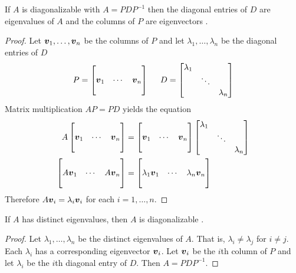 \begin{proposition}
If $A$ is diagonalizable with $A = PDP^{-1}$ then the diagonal entries of $D$ are eigenvalues of $A$ and the columns of $P$ are eigenvectors \cite[p.179]{KN}.

\begin{proof}
Let $\boldsymbol{v}_1,\dots, \boldsymbol{v}_n$ be the columns of $P$ and let $\lambda_1,\dots,\lambda_n$ be the diagonal entries of $D$
$$
P = \begin{bmatrix} & & \\ \boldsymbol{v}_1 & \cdots & \boldsymbol{v}_n \\ & & \end{bmatrix}
\hspace{5mm}
D = \begin{bmatrix} \lambda_1 & & \\ & \ddots & \\ & & \lambda_n \end{bmatrix}
$$
Matrix multiplication $AP = PD$ yields the equation
\begin{align*}
A \begin{bmatrix} & & \\ \boldsymbol{v}_1 & \cdots & \boldsymbol{v}_n \\ & & \end{bmatrix}
&=
\begin{bmatrix} & & \\ \boldsymbol{v}_1 & \cdots & \boldsymbol{v}_n \\ & & \end{bmatrix}
\begin{bmatrix} \lambda_1 & & \\ & \ddots & \\ & & \lambda_n \end{bmatrix} \\
\begin{bmatrix} & & \\ A \boldsymbol{v}_1 & \cdots & A \boldsymbol{v}_n \\ & & \end{bmatrix}
&=
\begin{bmatrix} & & \\ \lambda_1 \boldsymbol{v}_1 & \cdots & \lambda_n \boldsymbol{v}_n \\ & & \end{bmatrix}
\end{align*}
Therefore $A \boldsymbol{v}_i = \lambda_i \boldsymbol{v}_i$ for each $i=1,\dots,n$.
\end{proof}
\end{proposition}

\begin{proposition}
If $A$ has distinct eigenvalues, then $A$ is diagonalizable \cite[p.181]{KN}.

\begin{proof}
Let $\lambda_1,\dots,\lambda_n$ be the distinct eigenvalues of $A$. That is, $\lambda_i \not= \lambda_j$ for $i \not= j$. Each $\lambda_i$ has a corresponding eigenvector $\boldsymbol{v}_i$. Let $\boldsymbol{v}_i$ be the $i$th column of $P$ and let $\lambda_i$ be the $i$th diagonal entry of $D$. Then $A = PDP^{-1}$.
\end{proof}
\end{proposition}

